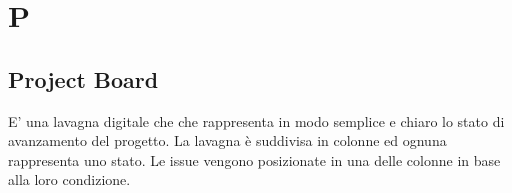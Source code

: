 \section{P}
\subsection{Project Board}
E' una lavagna digitale che che rappresenta in modo semplice e chiaro lo stato di avanzamento del progetto. La lavagna è suddivisa in colonne ed ognuna rappresenta uno stato.  Le issue vengono posizionate in una delle colonne in base alla loro condizione.
\clearpage